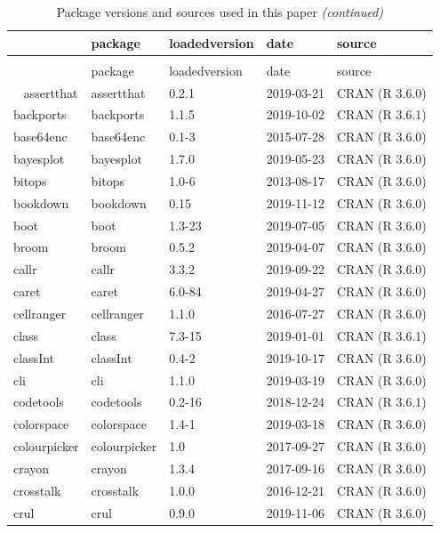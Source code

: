 \documentclass[]{article}
\begin{document}
\begin{longtable}[t]{lllll}
\caption{\label{tab:pkg-info}Package versions and sources used in this paper}\\
\toprule
  & package & loadedversion & date & source\\
\midrule
\endfirsthead
\caption[]{\label{tab:pkg-info}Package versions and sources used in this paper \textit{(continued)}}\\
\toprule
  & package & loadedversion & date & source\\
\midrule
\endhead
\
\endfoot
\bottomrule
\endlastfoot
assertthat & assertthat & 0.2.1 & 2019-03-21 & CRAN (R 3.6.0)\\
backports & backports & 1.1.5 & 2019-10-02 & CRAN (R 3.6.1)\\
base64enc & base64enc & 0.1-3 & 2015-07-28 & CRAN (R 3.6.0)\\
bayesplot & bayesplot & 1.7.0 & 2019-05-23 & CRAN (R 3.6.0)\\
bitops & bitops & 1.0-6 & 2013-08-17 & CRAN (R 3.6.0)\\
\addlinespace
bookdown & bookdown & 0.15 & 2019-11-12 & CRAN (R 3.6.0)\\
boot & boot & 1.3-23 & 2019-07-05 & CRAN (R 3.6.0)\\
broom & broom & 0.5.2 & 2019-04-07 & CRAN (R 3.6.0)\\
callr & callr & 3.3.2 & 2019-09-22 & CRAN (R 3.6.0)\\
caret & caret & 6.0-84 & 2019-04-27 & CRAN (R 3.6.0)\\
\addlinespace
cellranger & cellranger & 1.1.0 & 2016-07-27 & CRAN (R 3.6.0)\\
class & class & 7.3-15 & 2019-01-01 & CRAN (R 3.6.1)\\
classInt & classInt & 0.4-2 & 2019-10-17 & CRAN (R 3.6.0)\\
cli & cli & 1.1.0 & 2019-03-19 & CRAN (R 3.6.0)\\
codetools & codetools & 0.2-16 & 2018-12-24 & CRAN (R 3.6.1)\\
\addlinespace
colorspace & colorspace & 1.4-1 & 2019-03-18 & CRAN (R 3.6.0)\\
colourpicker & colourpicker & 1.0 & 2017-09-27 & CRAN (R 3.6.0)\\
crayon & crayon & 1.3.4 & 2017-09-16 & CRAN (R 3.6.0)\\
crosstalk & crosstalk & 1.0.0 & 2016-12-21 & CRAN (R 3.6.0)\\
crul & crul & 0.9.0 & 2019-11-06 & CRAN (R 3.6.0)\\

\end{longtable}
\end{document}

